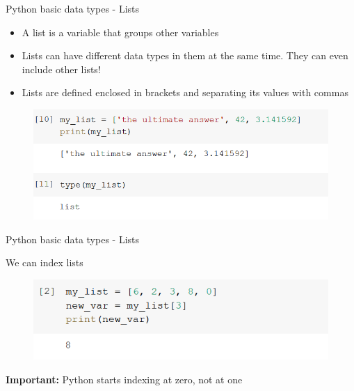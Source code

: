 \documentclass[aspectratio=169]{beamer}
\begin{document}
\begin{frame}{Python basic data types - Lists}

	\begin{itemize}
		\item A list is a variable that groups other variables
		\item Lists can have different data types in them at the same time. They can even include other lists!
		\item Lists are defined enclosed in brackets and separating its values with commas
	\end{itemize}

	\begin{figure}
		\centering
		\includegraphics[width=0.8\linewidth]{img/list_type.png}
	\end{figure}

\end{frame}

\begin{frame}{Python basic data types - Lists}

	We can index lists

	\begin{figure}
		\centering
		\includegraphics[width=0.6\linewidth]{img/list_index.png}
	\end{figure}

	\textbf{Important:} Python starts indexing at zero, not at one

\end{frame}
\end{document}
